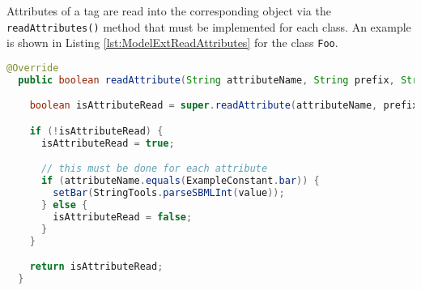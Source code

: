 Attributes of a tag are read into the corresponding object via the
\texttt{readAttributes()} method that must be implemented for each class.
An example is shown in Listing \ref{lst:ModelExtReadAttributes} for the class
\texttt{Foo}.

\begin{lstlisting}[language=Java,caption={Method to read the XML attributes},label={lst:ModelExtReadAttributes}]
  @Override
  public boolean readAttribute(String attributeName, String prefix, String value) {

    boolean isAttributeRead = super.readAttribute(attributeName, prefix, value);

    if (!isAttributeRead) {
      isAttributeRead = true;

      // this must be done for each attribute
      if (attributeName.equals(ExampleConstant.bar)) {
        setBar(StringTools.parseSBMLInt(value));
      } else {
        isAttributeRead = false;
      }
    }

    return isAttributeRead;
  }
\end{lstlisting}



